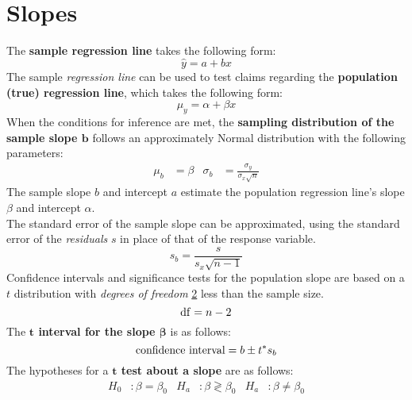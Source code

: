 \documentclass[../AP_Statistics.tex]{subfiles}
\begin{document}
	\chapter{Slopes}
		The \textbf{sample regression line} takes the following form:
		\[\hat{y} = a + bx\]
		The sample \emph{regression line} can be used to test claims regarding the \textbf{population (true) regression line}, which takes the following form:
		\[\mu_y = \alpha + \beta x\]
		When the conditions for inference are met, the \textbf{sampling distribution of the sample slope $\bm{b}$} follows an approximately Normal distribution with the following parameters:
		\begin{align*}
			\mu_b &= \beta & \sigma_b &= \frac{\sigma_y}{\sigma_x\sqrt{n}}
		\end{align*}
		The sample slope $b$ and intercept $a$ estimate the population regression line's slope $\beta$ and intercept $\alpha$. \\
		The standard error of the sample slope can be approximated, using the standard error of the \emph{residuals} $s$ in place of that of the response variable.
		\[s_b = \frac{s}{s_x\sqrt{n - 1}}\]
		Confidence intervals and significance tests for the population slope are based on a $t$ distribution with \emph{degrees of freedom} \underline{2} less than the sample size.
		\[\operatorname{\mathrm{df}} = n - 2\]
		The \textbf{$\bm{t}$ interval for the slope $\bm{\beta}$} is as follows:
		\[\text{confidence interval} = b \pm t^*s_b\]
		The hypotheses for a \textbf{$\bm{t}$ test about a slope} are as follows:
		\begin{align*}
			H_0&: \beta = \beta_0 & H_a&: \beta \gtrless \beta_0 & H_a&: \beta \ne \beta_0
		\end{align*}
\end{document}
